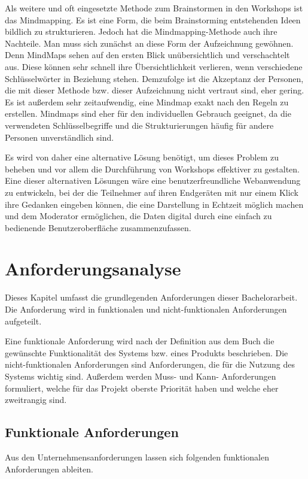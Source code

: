 Als weitere und oft eingesetzte Methode zum Brainstormen in den Workshops ist das Mindmapping. Es ist eine Form, die beim Brainstorming entstehenden Ideen bildlich zu strukturieren. Jedoch hat die Mindmapping-Methode auch ihre Nachteile. Man muss sich zunächst an diese Form der Aufzeichnung gewöhnen. Denn MindMaps sehen auf den ersten Blick unübersichtlich und verschachtelt aus. Diese können sehr schnell ihre Übersichtlichkeit verlieren, wenn verschiedene Schlüsselwörter in Beziehung stehen. Demzufolge ist die Akzeptanz der Personen, die mit dieser Methode bzw. dieser Aufzeichnung nicht vertraut sind, eher gering. Es ist außerdem sehr zeitaufwendig, eine Mindmap exakt nach den Regeln zu erstellen. Mindmaps sind eher für den individuellen Gebrauch geeignet, da die verwendeten Schlüsselbegriffe und die Strukturierungen häufig für andere Personen unverständlich sind.\bigskip

Es wird von daher eine alternative Lösung benötigt, um dieses Problem zu beheben und vor allem die Durchführung von Workshops effektiver zu gestalten. Eine dieser alternativen Lösungen wäre eine benutzerfreundliche Webanwendung zu entwickeln, bei der die Teilnehmer auf ihren Endgeräten mit nur einem \glqq Klick\grqq{} ihre Gedanken eingeben können, die eine Darstellung in Echtzeit möglich machen und dem Moderator ermöglichen, die Daten digital durch eine einfach zu bedienende Benutzeroberfläche zusammenzufassen.

\section{Anforderungsanalyse}
\label{sec:anforderungsanalyse}
Dieses Kapitel umfasst die grundlegenden Anforderungen dieser Bachelorarbeit. Die Anforderung wird in funktionalen und nicht-funktionalen Anforderungen aufgeteilt.\bigskip

Eine funktionale Anforderung wird nach der Definition aus dem Buch \cite{Balzert2010} die gewünschte Funktionalität des Systems bzw. eines Produkts beschrieben. Die nicht-funktionalen Anforderungen sind Anforderungen, die für die Nutzung des Systems wichtig sind. Außerdem werden Muss- und Kann- Anforderungen formuliert, welche für das Projekt oberste Priorität haben und welche eher zweitrangig sind.

\subsection{Funktionale Anforderungen}
\label{sec:funktionale anforderungen}
Aus den Unternehmensanforderungen lassen sich folgenden funktionalen Anforderungen ableiten.


